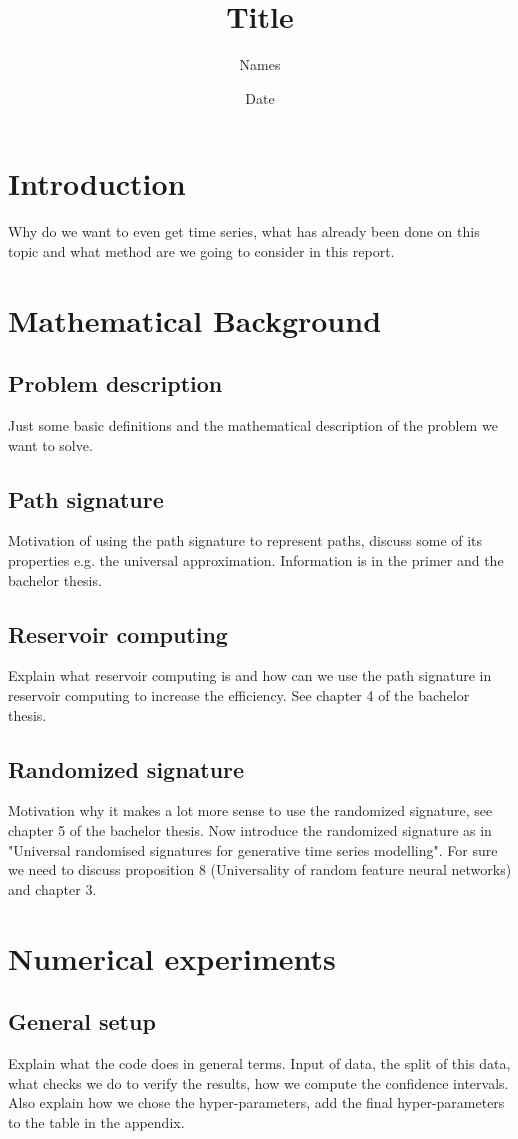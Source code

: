 \documentclass{article}
\title{Title}
\author{Names}
\date{Date}
\begin{document}
\maketitle

\section{Introduction}
Why do we want to even get time series, what has already been done on this topic and what method are we going to consider in this report. 

\section{Mathematical Background}
\subsection{Problem description}
Just some basic definitions and the mathematical description of the problem we want to solve. 
\subsection{Path signature}
Motivation of using the path signature to represent paths, discuss some of its properties e.g. the universal approximation. Information is in the primer and the bachelor thesis.  
\subsection{Reservoir computing}
Explain what reservoir computing is and how can we use the path signature in reservoir computing to increase the efficiency. See chapter 4 of the bachelor thesis.
\subsection{Randomized signature}
Motivation why it makes a lot more sense to use the randomized signature, see chapter 5 of the bachelor thesis. Now introduce the randomized signature as in "Universal randomised signatures for generative time series modelling". For sure we need to discuss proposition 8 (Universality of random feature neural networks) and chapter 3.

\section{Numerical experiments}
\subsection{General setup}
Explain what the code does in general terms. Input of data, the split of this data, what checks we do to verify the results, how we compute the confidence intervals. Also explain how we chose the hyper-parameters, add the final hyper-parameters to the table in the appendix. 
\end{document}
